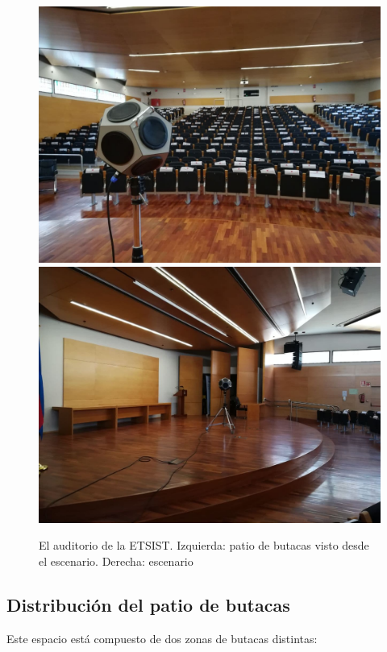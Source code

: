 \documentclass[11pt,a4paper,twoside]{book}
\begin{document}
 			\begin{figure}
 				\includegraphics[scale=.25]{../imagenes/fuente.jpg}%
 				\includegraphics[scale=.25]{../imagenes/fuente2.jpg} 
 				\centering
 				\caption{El auditorio de la ETSIST. Izquierda: patio de butacas visto desde el escenario. Derecha: escenario}
 				\label{fig:materiales}

 			\end{figure}
 


		\subsection{Distribución del patio de butacas}
			Este espacio está compuesto de dos zonas de butacas distintas:
\end{document}

